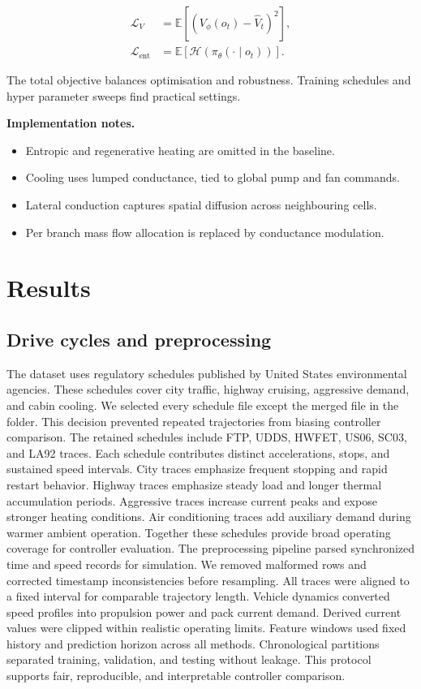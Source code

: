 \documentclass{article}
\begin{document}
\begin{align}
\mathcal{L}_V &= \mathbb{E}\left[{(V_{\phi}(o_t) - \hat V_t)}^2\right],\\
\mathcal{L}_{\mathrm{ent}} &= \mathbb{E}\left[\mathcal{H}(\pi_{\theta}(\cdot \mid o_t))\right].
\end{align}

The total objective balances optimisation and robustness.
Training schedules and hyper parameter sweeps find practical settings.

\bigskip

\noindent\textbf{Implementation notes.}
\begin{itemize}
  \item Entropic and regenerative heating are omitted in the baseline.
  \item Cooling uses lumped conductance, tied to global pump and fan commands.
  \item Lateral conduction captures spatial diffusion across neighbouring cells.
  \item Per branch mass flow allocation is replaced by conductance modulation.
\end{itemize}
\section{Results}
\subsection{Drive cycles and preprocessing}

The dataset uses regulatory schedules published by United States environmental agencies.\cite{EPA_Dynamometer}
These schedules cover city traffic, highway cruising, aggressive demand, and cabin cooling.
We selected every schedule file except the merged file in the folder.
This decision prevented repeated trajectories from biasing controller comparison.
The retained schedules include FTP, UDDS, HWFET, US06, SC03, and LA92 traces.
Each schedule contributes distinct accelerations, stops, and sustained speed intervals.
City traces emphasize frequent stopping and rapid restart behavior.
Highway traces emphasize steady load and longer thermal accumulation periods.
Aggressive traces increase current peaks and expose stronger heating conditions.
Air conditioning traces add auxiliary demand during warmer ambient operation.
Together these schedules provide broad operating coverage for controller evaluation.
The preprocessing pipeline parsed synchronized time and speed records for simulation.
We removed malformed rows and corrected timestamp inconsistencies before resampling.
All traces were aligned to a fixed interval for comparable trajectory length.
Vehicle dynamics converted speed profiles into propulsion power and pack current demand.
Derived current values were clipped within realistic operating limits.
Feature windows used fixed history and prediction horizon across all methods.
Chronological partitions separated training, validation, and testing without leakage.
This protocol supports fair, reproducible, and interpretable controller comparison.
\end{document}
